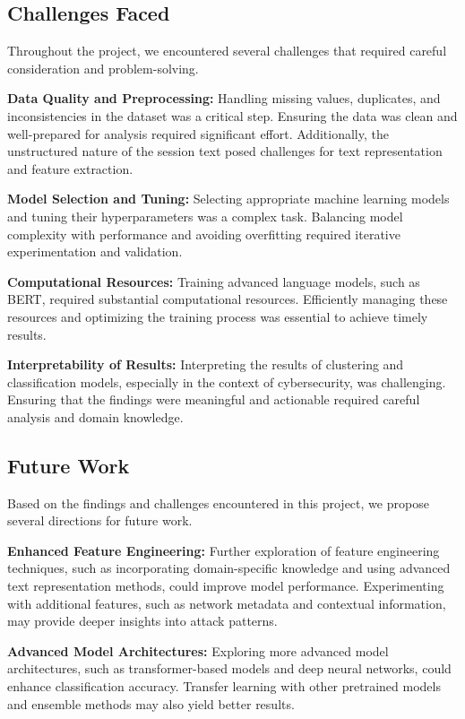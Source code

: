     \subsection{Challenges Faced}
    
        Throughout the project, we encountered several challenges that required careful consideration and problem-solving.

        \textbf{Data Quality and Preprocessing:} Handling missing values, duplicates, and inconsistencies in the dataset was a critical step. Ensuring the data was clean and well-prepared for analysis required significant effort. Additionally, the unstructured nature of the session text posed challenges for text representation and feature extraction.

        \textbf{Model Selection and Tuning:} Selecting appropriate machine learning models and tuning their hyperparameters was a complex task. Balancing model complexity with performance and avoiding overfitting required iterative experimentation and validation.

        \textbf{Computational Resources:} Training advanced language models, such as BERT, required substantial computational resources. Efficiently managing these resources and optimizing the training process was essential to achieve timely results.

        \textbf{Interpretability of Results:} Interpreting the results of clustering and classification models, especially in the context of cybersecurity, was challenging. Ensuring that the findings were meaningful and actionable required careful analysis and domain knowledge.

    \subsection{Future Work}
    
        Based on the findings and challenges encountered in this project, we propose several directions for future work.

        \textbf{Enhanced Feature Engineering:} Further exploration of feature engineering techniques, such as incorporating domain-specific knowledge and using advanced text representation methods, could improve model performance. Experimenting with additional features, such as network metadata and contextual information, may provide deeper insights into attack patterns.

        \textbf{Advanced Model Architectures:} Exploring more advanced model architectures, such as transformer-based models and deep neural networks, could enhance classification accuracy. Transfer learning with other pretrained models and ensemble methods may also yield better results.

